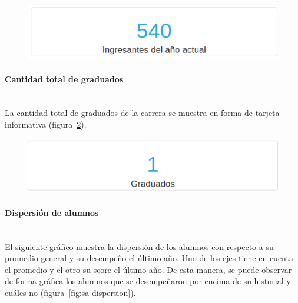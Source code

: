 \begin{figure}[H]
  \centering
    \includegraphics[scale=0.4]{images/seguimiento-academico/sa-ingresantes.png}
  \label{fig:sa-ingresantes}
\end{figure}

\paragraph{Cantidad total de graduados} \mbox{}\\
La cantidad total de graduados de la carrera se muestra en forma de tarjeta informativa (figura~\ref{fig:sa-graduados}).

\begin{figure}[H]
  \centering
    \includegraphics[scale=0.4]{images/seguimiento-academico/sa-graduados.png}
  \label{fig:sa-graduados}
\end{figure}

\paragraph{Dispersión de alumnos} \mbox{}\\
El siguiente gráfico muestra la dispersión de los alumnos con respecto a su promedio general y su desempeño el último año. Uno de los ejes tiene en cuenta el promedio y el otro su score el último año. De esta manera, se puede observar de forma gráfica los alumnos que se desempeñaron por encima de su historial y cuáles no (figura~\ref{fig:sa-dispersion}).

